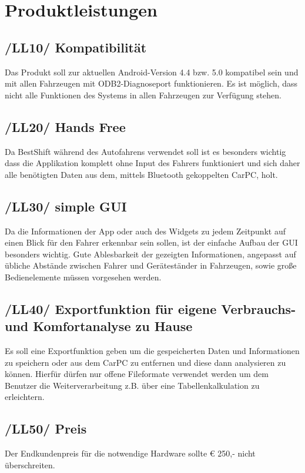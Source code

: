 \newpage
\chapter{Produktleistungen}

\section{/LL10/ Kompatibilität}
\newline
Das Produkt soll zur aktuellen Android-Version 4.4 bzw. 5.0 kompatibel sein und mit allen Fahrzeugen mit ODB2-Diagnoseport funktionieren. Es ist möglich, dass nicht alle Funktionen des Systems in allen Fahrzeugen zur Verfügung stehen.

\section{/LL20/ Hands Free}
\newline
Da BestShift während des Autofahrens verwendet soll ist es besonders wichtig dass die Applikation komplett ohne Input des Fahrers funktioniert und sich daher alle benötigten Daten aus dem, mittels Bluetooth gekoppelten CarPC, holt. 

\section{/LL30/ simple GUI}
\newline
Da die Informationen der App oder auch des Widgets zu jedem Zeitpunkt auf einen Blick für den Fahrer erkennbar sein sollen, ist der einfache Aufbau der GUI besonders wichtig. Gute Ablesbarkeit der gezeigten Informationen, angepasst auf übliche Abstände zwischen Fahrer und Geräteständer in Fahrzeugen, sowie große Bedienelemente müssen vorgesehen werden.

\section{/LL40/ Exportfunktion für eigene Verbrauchs- und Komfortanalyse zu Hause}
\newline
Es soll eine Exportfunktion geben um die gespeicherten Daten und Informationen zu speichern oder aus dem CarPC zu entfernen und diese dann analysieren zu können. Hierfür dürfen nur offene Fileformate verwendet werden um dem Benutzer die Weiterverarbeitung z.B. über eine Tabellenkalkulation zu erleichtern. 

\section{/LL50/ Preis}
\newline
Der Endkundenpreis für die notwendige Hardware sollte € 250,- nicht überschreiten.